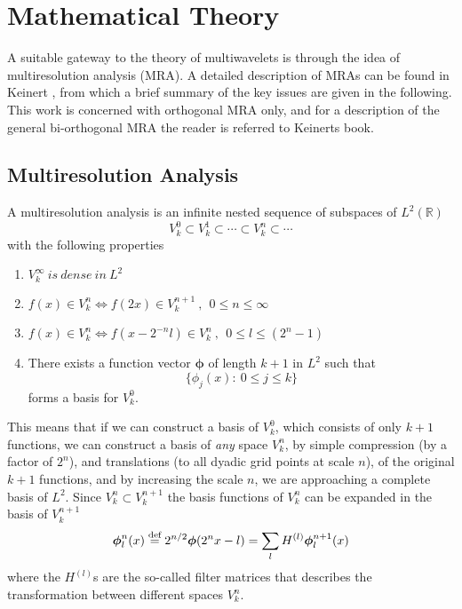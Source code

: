 \chapter{Mathematical Theory}
A suitable gateway to the theory of multiwavelets is through the idea of
multiresolution analysis (MRA). A detailed description of MRAs can be found in
Keinert \cite{Keinert}, from which a brief summary of the key issues are 
given in the following. This work is concerned with orthogonal MRA only, and
for a description of the general bi-orthogonal MRA the reader is referred to
Keinerts book. 

\section{Multiresolution Analysis}
A multiresolution analysis is an infinite nested sequence
of subspaces of $L^2(\mathbb{R})$ 
\begin{equation}
	\label{eq:MRA}
	V^0_k\subset V^1_k\subset \cdots \subset V^n_k\subset \cdots
\end{equation}
with the following properties
\begin{enumerate}
	\item $V^\infty_k\ is\ dense\ in\ L^2$
	\item $f(x) \in V^n_k \Longleftrightarrow f(2x) \in V^{n+1}_k\ ,\ \ 
		0 \leq n \leq \infty$
	\item $f(x) \in V^n_k \Longleftrightarrow f(x-2^{-n}l) \in V^n_k\ ,\ \ 
		0 \leq l \leq (2^n-1)$
	\item There exists a function vector $\boldsymbol{\phi}$ of length $k+1$
			in $L^2$ such that 
			\[\lbrace \phi_j(x):\  0\leq j\leq k \rbrace\] 
			forms a basis for $V^0_k$. 
\end{enumerate}

\noindent
This means that if we can construct a basis of $V^0_k$, which consists of only
$k+1$ functions, we can construct a basis of \emph{any} space $V^n_k$, by
simple compression (by a factor of $2^n$), and translations (to all dyadic
grid points at scale $n$), of the original $k+1$ functions, and by increasing
the scale $n$, we are approaching a complete basis of $L^2$. Since $V^n_k
\subset V^{n+1}_k$ the basis functions of $V^n_k$ can be expanded in the basis 
of $V^{n+1}_k$
\begin{equation}
	\label{eq:twoscalescaling}
	\boldsymbol{\phi}^n_l(x) \stackrel{\text{def}}{\hbox{=}} 2^{n/2}\boldsymbol{\phi}(2^nx-l) = 
								\sum_l H^{(l)} \boldsymbol{\phi}^{n+1}_l(x)
\end{equation}
where the $H^{(l)}$s are the so-called filter matrices that describes the 
transformation between different spaces $V^n_k$.\\

